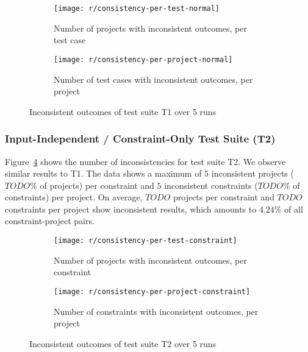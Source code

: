 \begin{figure}[htpb]
    \centering
    \begin{subfigure}{.475\textwidth}
        \texttt{[image: r/consistency-per-test-normal]}%
        \vspace{-\medskipamount}
        \caption{Number of projects with inconsistent outcomes, per test case}
        \label{fig:consistency_per_test_normal}
    \end{subfigure}
    \begin{subfigure}{.475\textwidth}
        \texttt{[image: r/consistency-per-project-normal]}%
        \vspace{-\medskipamount}
        \caption{Number of test cases with inconsistent outcomes, per project}
        \label{fig:consistency_per_project_normal}
    \end{subfigure}

    \caption{Inconsistent outcomes of test suite T1 over 5 runs}
    \label{fig:consistency_normal}
\end{figure}

\subsubsection{Input-Independent / Constraint-Only Test Suite (T2)}

Figure~\ref{fig:consistency_per_test_constraint} shows the number of inconsistencies for test suite T2.
We observe similar results to T1.
The data shows a maximum of $5$ inconsistent projects ($TODO\%$ of projects) per constraint and $5$ inconsistent constraints ($TODO\%$ of constraints) per project.
On average, $TODO$ projects per constraint and $TODO$ constraints per project show inconsistent results,
which amounts to $4.24\%$ of all constraint-project pairs.
\parspace

\begin{figure}[htpb]
    \centering
    \begin{subfigure}{.475\textwidth}
        \texttt{[image: r/consistency-per-test-constraint]}%
        \vspace{-\medskipamount}
        \caption{Number of projects with inconsistent outcomes, per constraint}
        \label{fig:consistency_per_test_constraint}
    \end{subfigure}
    \begin{subfigure}{.475\textwidth}
        \texttt{[image: r/consistency-per-project-constraint]}%
        \vspace{-\medskipamount}
        \caption{Number of constraints with inconsistent outcomes, per project}
        \label{fig:consistency_per_project_constraint}
    \end{subfigure}

    \caption{Inconsistent outcomes of test suite T2 over 5 runs}
    \label{fig:consistency_constraint}
\end{figure}

